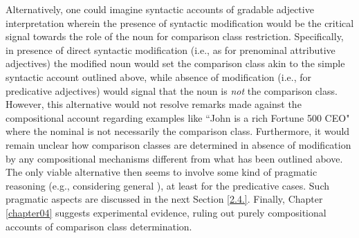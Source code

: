 Alternatively, one could imagine syntactic accounts of gradable adjective interpretation wherein the presence of syntactic modification would be the critical signal towards the role of the noun for comparison class restriction. Specifically, in presence of direct syntactic modification (i.e., as for prenominal attributive adjectives) the modified noun would set the comparison class akin to the simple syntactic account outlined above,  while absence of modification (i.e., for predicative adjectives) would signal that the noun is \emph{not} the comparison class. However, this alternative would not resolve remarks made against the compositional account regarding examples like ``John is a rich Fortune 500 CEO" where the nominal is not necessarily the comparison class. Furthermore, it would remain unclear how comparison classes are determined in absence of modification by any compositional mechanisms different from what has been outlined above. The only viable alternative then seems to involve some kind of pragmatic reasoning (e.g., considering general \textcite[world knowledge][]{tessler2017warm}), at least for the predicative cases. Such pragmatic aspects are discussed in the next Section \ref{2.4.}. Finally, Chapter \ref{chapter04} suggests experimental evidence, ruling out purely compositional accounts of comparison class determination. 

